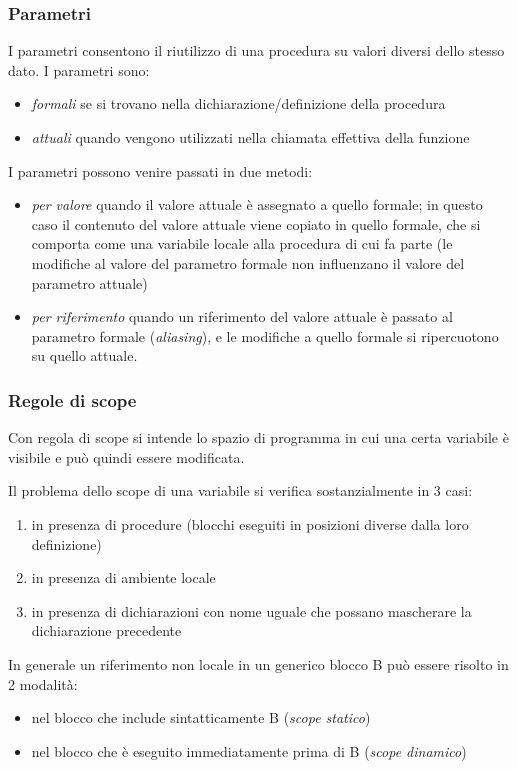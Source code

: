 \documentclass{article}[10pt]
\begin{document}
	\subsubsection{Parametri}
	I parametri consentono il riutilizzo di una procedura su valori diversi dello stesso dato.
	I parametri sono:
	\begin{itemize}
		\item \textit{formali} se si trovano nella dichiarazione/definizione della procedura
		\item \textit{attuali} quando vengono utilizzati nella chiamata effettiva della funzione
	\end{itemize}

	I parametri possono venire passati in due metodi:
	\begin{itemize}
		\item \textit{per valore} quando il valore attuale è assegnato a quello formale; in questo caso il contenuto del valore attuale viene copiato in quello formale, che si comporta come una variabile locale alla procedura di cui fa parte (le modifiche al valore del parametro formale non influenzano il valore del parametro attuale)
		
		\item \textit{per riferimento} quando un riferimento del valore attuale è passato al parametro formale (\textit{aliasing}), e le modifiche a quello formale si ripercuotono su quello attuale.
	\end{itemize}
	
	\subsubsection{Regole di scope}
	Con regola di scope si intende lo spazio di programma in cui una certa variabile è visibile e può quindi essere modificata.
	
	Il problema dello scope di una variabile si verifica sostanzialmente in 3 casi:
	\begin{enumerate}
		\item in presenza di procedure (blocchi eseguiti in posizioni diverse dalla loro definizione)
		\item in presenza di ambiente locale
		\item in presenza di dichiarazioni con nome uguale che possano mascherare la dichiarazione precedente
	\end{enumerate}

	In generale un riferimento non locale in un generico blocco B può essere risolto in 2 modalità:
	\begin{itemize}
		\item nel blocco che include sintatticamente B (\textit{scope statico})
		\item nel blocco che è eseguito immediatamente prima di B (\textit{scope dinamico})
	\end{itemize}
\newpage
\end{document}
